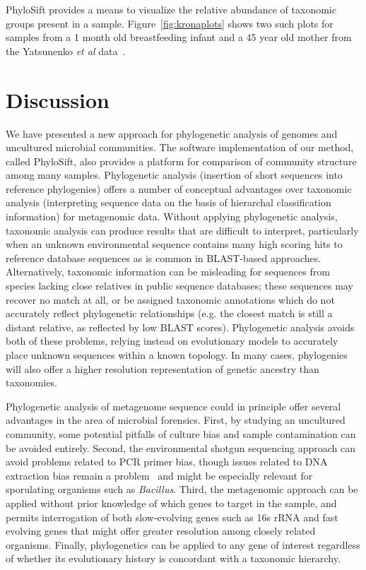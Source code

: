 \documentclass[10pt]{article}
\begin{document}
PhyloSift provides a means to visualize the relative abundance of taxonomic groups present in a sample.
Figure~\ref{fig:kronaplots} shows two such plots for samples from a 1 month old breastfeeding infant and a 45 year old mother from the Yatsunenko \textit{et al} data~\cite{Yatsunenko2012}.


\section*{Discussion}
We have presented a new approach for phylogenetic analysis of genomes and uncultured microbial communities.
The software implementation of our method, called PhyloSift, also provides a platform for comparison of community structure among many samples.
Phylogenetic analysis (insertion of short sequences into reference phylogenies) offers a number of conceptual advantages over taxonomic analysis (interpreting sequence data on the basis of hierarchal classification information) for metagenomic data.
Without applying phylogenetic analysis, taxonomic analysis can produce results that are difficult to interpret, particularly when an unknown environmental sequence contains many high scoring hits to reference database sequences as is common in BLAST-based approaches.
Alternatively, taxonomic information can be misleading for sequences from species lacking close relatives in public sequence databases; these sequences may recover no match at all, or be assigned taxonomic annotations which do not accurately reflect phylogenetic relationships (e.g. the closest match is still a distant relative, as reflected by low BLAST scores).
Phylogenetic analysis avoids both of these problems, relying instead on evolutionary models to accurately place unknown sequences within a known topology.
In many cases, phylogenies will also offer a higher resolution representation of genetic ancestry than taxonomies.


Phylogenetic analysis of metagenome sequence could in principle offer several advantages in the area of microbial forensics.
First, by studying an uncultured community, some potential pitfalls of culture bias and sample contamination can be avoided entirely.
Second, the environmental shotgun sequencing approach can avoid problems related to PCR primer bias, though issues related to DNA extraction bias remain a problem~\cite{Morgan2010} and might be especially relevant for sporulating organisms such as \textit{Bacillus}.
Third, the metagenomic approach can be applied without prior knowledge of which genes to target in the sample, and permits interrogation of both slow-evolving genes such as 16s rRNA and fast evolving genes that might offer greater resolution among closely related organisms.
Finally, phylogenetics can be applied to any gene of interest regardless of whether its evolutionary history is concordant with a taxonomic hierarchy.
\end{document}
